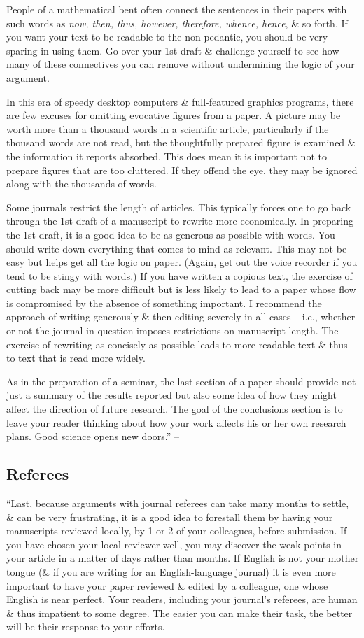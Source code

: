 \documentclass{article}
\numberwithin{equation}{section}
\begin{document}
People of a mathematical bent often connect the sentences in their papers with such words as \textit{now, then, thus, however, therefore, whence, hence}, \& so forth. If you want your text to be readable to the non-pedantic, you should be very sparing in using them. Go over your 1st draft \& challenge yourself to see how many of these connectives you can remove without undermining the logic of your argument.

In this era of speedy desktop computers \& full-featured graphics programs, there are few excuses for omitting evocative figures from a paper. A picture may be worth more than a thousand words in a scientific article, particularly if the thousand words are not read, but the thoughtfully prepared figure is examined \& the information it reports absorbed. This does mean it is important not to prepare figures that are too cluttered. If they offend the eye, they may be ignored along with the thousands of words.

Some journals restrict the length of articles. This typically forces one to go back through the 1st draft of a manuscript to rewrite more economically. In preparing the 1st draft, it is a good idea to be as generous as possible with words. You should write down everything that comes to mind as relevant. This may not be easy but helps get all the logic on paper. (Again, get out the voice recorder if you tend to be stingy with words.) If you have written a copious text, the exercise of cutting back may be more difficult but is less likely to lead to a paper whose flow is compromised by the absence of something important. I recommend the approach of writing generously \& then editing severely in all cases -- i.e., whether or not the journal in question imposes restrictions on manuscript length. The exercise of rewriting as concisely as possible leads to more readable text \& thus to text that is read more widely.

As in the preparation of a seminar, the last section of a paper should provide not just a summary of the results reported but also some idea of how they might affect the direction of future research. The goal of the conclusions section is to leave your reader thinking about how your work affects his or her own research plans. Good science opens new doors.'' -- \cite[pp. 64--66]{Feibelman2011}

\subsection{Referees}
``Last, because arguments with journal referees can take many months to settle, \& can be very frustrating, it is a good idea to forestall them by having your manuscripts reviewed locally, by 1 or 2 of your colleagues, before submission. If you have chosen your local reviewer well, you may discover the weak points in your article in a matter of days rather than months. If English is not your mother tongue (\& if you are writing for an English-language journal) it is even more important to have your paper reviewed \& edited by a colleague, one whose English is near perfect. Your readers, including your journal's referees, are human \& thus impatient to some degree. The easier you can make their task, the better will be their response to your efforts.
\end{document}
